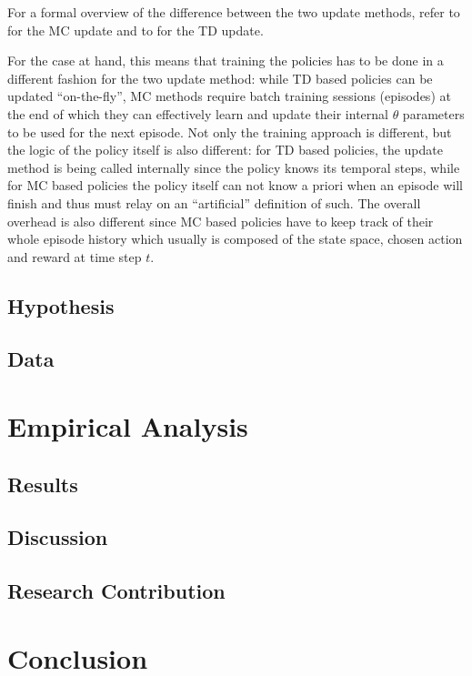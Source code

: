 \documentclass{seal_thesis}
\begin{document}
For a formal overview of the difference between the two update methods, refer to  for the MC update and to  for the TD update.

For the case at hand, this means that training the policies has to be done in a different fashion for the two update method: while TD based policies can be updated ``on-the-fly'', MC methods require batch training sessions (\ie episodes) at the end of which they can effectively learn and update their internal $\theta$ parameters to be used for the next episode. Not only the training approach is different, but the logic of the policy itself is also different: for TD based policies, the update method is being called internally since the policy knows its temporal steps, while for MC based policies the policy itself can not know a priori when an episode will finish and thus must relay on an ``artificial'' definition of such. The overall overhead is also different since MC based policies have to keep track of their whole episode history which usually is composed of the state space, chosen action and reward at time step $t$.


\section{Hypothesis}
\section{Data}

\chapter{Empirical Analysis}
\label{ch:empirical_analysis}



\section{Results}
\label{sec:results}
\section{Discussion}
\section{Research Contribution}

\chapter{Conclusion}
\label{ch:conclusion}
\end{document}
